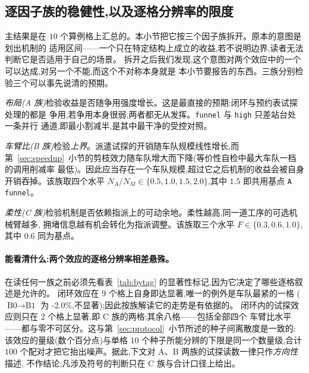 \documentclass[manuscript,screen,review]{acmart}
\newcommand{\NCases}{10}
\newcommand{\NSeeds}{10}
\newcommand{\NPairs}{100}
\newcommand{\CellsSigLoop}{9}
\newcommand{\CellsSigProbe}{2}
\newcommand{\GainLoopStarve}{-2.0\%}     %
\begin{document}

\subsection{逐因子族的稳健性,以及逐格分辨率的限度}
\label{sec:whichcongestion}

主结果是在 $\NCases$ 个算例格上汇总的。本小节把它按三个因子族拆开。原本的意图是划出机制的
适用区间——一个只在特定结构上成立的收益,若不说明边界,读者无法判断它是否适用于自己的场景。
拆开之后我们发现,这个意图对两个效应中的一个可以达成,对另一个不能,而这个不对称本身就是
本小节要报告的东西。三族分别检验三个可以事先说清的预期。

\emph{布局(A 族)}检验收益是否随争用强度增长。这是最直接的预期:闭环与预约表试探处理的都是
争用,若争用本身很弱,两者都无从发挥。\texttt{funnel} 与 \texttt{high} 只差站台处一条并行
通道,即最小割减半,是其中最干净的受控对照。

\emph{车臂比(B 族)}检验\emph{上界}。派遣试探的开销随车队规模线性增长,而
第~\ref{sec:speedup}~小节的剪枝效力随车队增大而下降(等价性自检中最大车队一档的调用削减率
最低)。因此应当存在一个车队规模,超过它之后机制的收益会被自身开销吞掉。该族取四个水平
$N_A/N_M\in\{0.5,1.0,1.5,2.0\}$,其中 $1.5$ 即共用基点 \texttt{A funnel}。

\emph{柔性(C 族)}检验机制是否依赖指派上的可动余地。柔性越高,同一道工序的可选机械臂越多,
拥堵信息越有机会转化为指派调整。该族取三个水平 $F\in\{0.3,0.6,1.0\}$,其中 $0.6$ 同为基点。

\paragraph{能看清什么:两个效应的逐格分辨率相差悬殊。}
在读任何一族之前必须先看表~\ref{tab:bytag} 的显著性标记,因为它决定了哪些逐格叙述是允许的。
闭环效应在 \CellsSigLoop{} 个格上自身即达显著,唯一的例外是车队最紧的一格
($\text{B0}\to\text{B1}$ 为 \GainLoopStarve{},不显著);因此按族解读它的走势是有依据的。
闭环内的试探效应则只在 \CellsSigProbe{} 个格上显著,即 C 族的两格;其余八格——包括全部四个
车臂比水平——都与零不可区分。这与第~\ref{sec:protocol}~小节所述的种子间离散度是一致的:
该效应的量级(数个百分点)与单格 \NSeeds{} 个种子所能分辨的下限是同一个数量级,合计
$\NPairs$ 个配对才把它抬出噪声。据此,下文对 A、B 两族的试探读数一律只作\emph{方向性}描述,
不作结论;凡涉及符号的判断只在 C 族与合计口径上给出。
\end{document}
